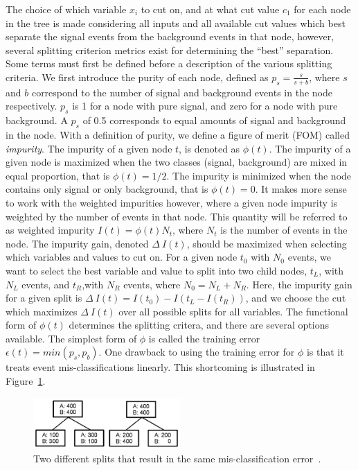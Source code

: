 The choice of which variable $x_{i}$ to cut on, and at what cut value $c_{1}$ for each node
in the tree is made considering all inputs and all available cut values which best separate the signal events from the background events in that node, however, 
several splitting criterion metrics exist for determining the ``best'' separation. 
Some terms must first be defined before a description of the various splitting criteria.
We first introduce the purity of each node, defined as $p_{s}=\frac{s}{s+b}$, where $s$ and $b$ correspond to the number of signal and background
events in the node respectively. $p_{s}$ is 1 for a node with pure signal, and zero for a node with pure background. A $p_{s}$ of 0.5 corresponds to equal amounts
of signal and background in the node.
With a definition of purity, we define a figure of merit (FOM) called \textit{impurity}. The impurity of a given node $t$, is denoted as $\phi(t)$.
The impurity of a given node is maximized when the two classes (signal, background) are mixed in equal proportion, that is $\phi(t) = 1/2$.
The impurity is minimized when the node contains only signal or only background, that is $\phi(t) = 0$.
It makes more sense to work with the weighted impurities however, where a given node impurity is weighted by the number of events in that node. This quantity
will be referred to as weighted impurity $I(t) = \phi(t)N_{t}$, where $N_{t}$ is the number of events in the node. 
The impurity gain, denoted $\Delta~I(t)$, should be maximized when selecting which variables and values to cut on. For a given node $t_{0}$ with $N_{0}$ events, we want to
select the best variable and value to split into two child nodes, $t_{L}$, with $N_{L}$ events, and $t_{R}$,with $N_{R}$ events, where $N_{0} = N_{L} + N_{R}$. Here, the
impurity gain for a given split is $\Delta~I(t) = I(t_{0}) - I(t_{L} - I(t_{R}))$, and we choose the cut which maximizes $\Delta~I(t)$ over all possible splits for all variables.
The functional form of $\phi(t)$ determines the splitting critera, and there are several options available.
The simplest form of $\phi$ is called the training error $\epsilon(t) = min(p_{s},p_{b})$.
One drawback to using the training error for $\phi$ is that it treats event mis-classifications linearly. This shortcoming is illustrated in Figure~\ref{fig:tree_split}.

\begin{figure}[hbtp]
 \begin{center}
   \includegraphics[width=0.5\textwidth]{ap1_figs/tree_split.pdf}
   \caption[Two splits with the same error rate.]{Two different splits that result in the same mis-classification error~\cite{illya}.}
   \label{fig:tree_split}
 \end{center}
\end{figure}

